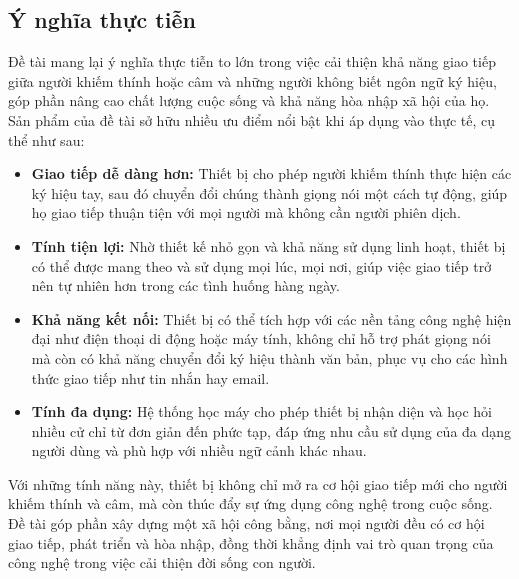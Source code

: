 \subsection{Ý nghĩa thực tiễn}
\indent Đề tài mang lại ý nghĩa thực tiễn to lớn trong việc cải thiện khả năng giao tiếp giữa người khiếm thính hoặc câm và những người không biết ngôn ngữ ký hiệu, góp phần nâng cao chất lượng cuộc sống và khả năng hòa nhập xã hội của họ. Sản phẩm của đề tài sở hữu nhiều ưu điểm nổi bật khi áp dụng vào thực tế, cụ thể như sau:
\begin{itemize}
    \item \textbf{Giao tiếp dễ dàng hơn:} Thiết bị cho phép người khiếm thính thực hiện các ký hiệu tay, sau đó chuyển đổi chúng thành giọng nói một cách tự động, giúp họ giao tiếp thuận tiện với mọi người mà không cần người phiên dịch.
    \item \textbf{Tính tiện lợi:} Nhờ thiết kế nhỏ gọn và khả năng sử dụng linh hoạt, thiết bị có thể được mang theo và sử dụng mọi lúc, mọi nơi, giúp việc giao tiếp trở nên tự nhiên hơn trong các tình huống hàng ngày.
    \item \textbf{Khả năng kết nối:} Thiết bị có thể tích hợp với các nền tảng công nghệ hiện đại như điện thoại di động hoặc máy tính, không chỉ hỗ trợ phát giọng nói mà còn có khả năng chuyển đổi ký hiệu thành văn bản, phục vụ cho các hình thức giao tiếp như tin nhắn hay email.
    \item \textbf{Tính đa dụng:} Hệ thống học máy cho phép thiết bị nhận diện và học hỏi nhiều cử chỉ từ đơn giản đến phức tạp, đáp ứng nhu cầu sử dụng của đa dạng người dùng và phù hợp với nhiều ngữ cảnh khác nhau.
\end{itemize}

\indent Với những tính năng này, thiết bị không chỉ mở ra cơ hội giao tiếp mới cho người khiếm thính và câm, mà còn thúc đẩy sự ứng dụng công nghệ trong cuộc sống. Đề tài góp phần xây dựng một xã hội công bằng, nơi mọi người đều có cơ hội giao tiếp, phát triển và hòa nhập, đồng thời khẳng định vai trò quan trọng của công nghệ trong việc cải thiện đời sống con người.